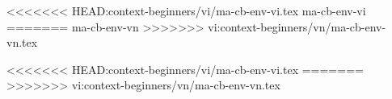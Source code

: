 <<<<<<< HEAD:context-beginners/vi/ma-cb-env-vi.tex
\startenvironment ma-cb-env-vi
=======
\startenvironment ma-cb-env-vn
>>>>>>> vi:context-beginners/vn/ma-cb-env-vn.tex

<<<<<<< HEAD:context-beginners/vi/ma-cb-env-vi.tex
\mainlanguage[vi]
\language[vi]
=======
\mainlanguage[vn]
\language[vn]
>>>>>>> vi:context-beginners/vn/ma-cb-env-vn.tex
\enableregime[utf]
\setupencoding[default=t5]

\stopenvironment

